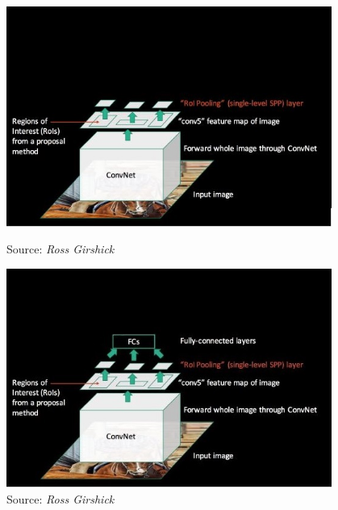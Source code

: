 \begin{frame}
\begin{columns}
\begin{overlayarea}{\textwidth}{\textheight}
\begin{figure}[h!]
\begin{overprint}
					\centering\includegraphics[scale= 0.45]{images/41}\caption[Caption]{\hspace{-90pt} Source: \it{Ross Girshick}}
					\centering\includegraphics[scale= 0.45]{images/42_fc}\caption[Caption]{\hspace{-90pt} Source: \it{Ross Girshick}}
				\end{overprint} 
			\end{figure}
		\end{overlayarea}     
		\begin{overlayarea}{\textwidth}{\textheight}
              

\end{overlayarea}
\end{columns}
\end{frame}
